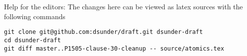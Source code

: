 
\vfill
Help for the editors: The changes here can be viewed as latex sources with the following commands
\begin{verbatim}
git clone git@github.com:dsunder/draft.git dsunder-draft
cd dsunder-draft
git diff master..P1505-clause-30-cleanup -- source/atomics.tex
\end{verbatim}
\newpage
